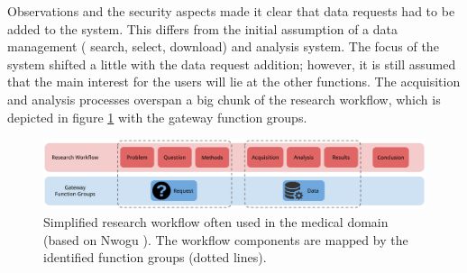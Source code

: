 Observations and the security aspects made it clear that data requests had to be added to the system.
This differs from the initial assumption of a data management (\eg{} search, select, download) and analysis system.
The focus of the system shifted a little with the data request addition; however, it is still assumed that the main interest for the users will lie at the other functions.
The acquisition and analysis processes overspan a big chunk of the research workflow, which is depicted in figure \ref{fig:research-workflow} with the gateway function groups.

\begin{figure}[h]
	\centering
	\includegraphics[width=0.98\linewidth]{images/research-workflow}
	\caption{
		Simplified research workflow often used  in the medical domain (based on Nwogu \cite{nwogu}).
		The workflow components are mapped  by the identified \ivfsystem{} function groups (dotted lines).
	}
	\label{fig:research-workflow}
\end{figure}